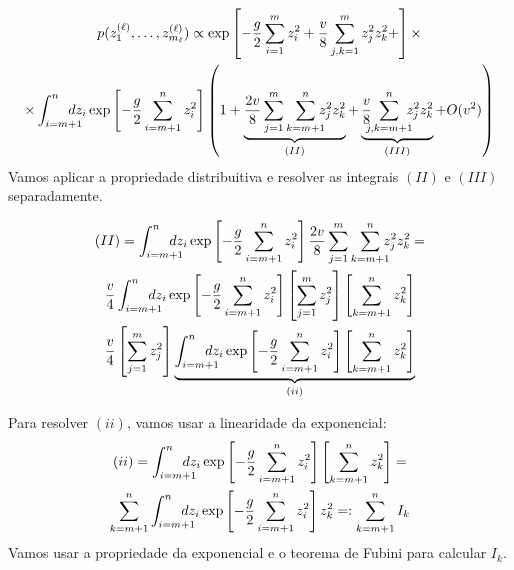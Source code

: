 \documentclass{beamer}
\def\eell{{(\ell)}}
\begin{document}
\begin{frame}

	{\footnotesize
	\begin{multline*}
		p(z_1^\eell, \ldots, z_{m_\ell}^\eell ) \propto \exp\left[-\frac{g}{2}\sum_{i=1}^{m}  z_i^2  + \frac{v}{8}\sum_{j,k=1}^{m}  z_j^2z_k^2 + \right]\times\\
		\times \int_{i=m+1}^{n}\hspace{-12pt} dz_i \exp\left[ -\frac{g}{2}\sum_{i=m+1}^{n}  z_i^2 \right] 
		\left(1+ \underbrace{\frac{2v}{8}\sum_{j=1}^{m}\sum_{k=m+1}^{n} \hspace*{-6pt}z_j^2z_k^2}_{(II)} +  \underbrace{\frac{v}{8}\hspace{-6pt}\sum_{j,k=m+1}^{n} \hspace{-6pt} z_j^2 z_k^2}_{(III)}  + O(v^2)\right)
	\end{multline*}}
	Vamos aplicar a propriedade distribuitiva e resolver as integrais $(II)$ e $(III)$ separadamente.
\end{frame}

\begin{frame}

	\small
	\begin{multline*}
		(II) = \int_{i=m+1}^{n}\hspace{-12pt} dz_i \exp\left[ -\frac{g}{2}\sum_{i=m+1}^{n}  z_i^2 \right] \frac{2v}{8}\sum_{j=1}^{m}\sum_{k=m+1}^{n} \hspace*{-6pt}z_j^2z_k^2 = \\ %
		 \frac{v}{4}\int_{i=m+1}^{n}\hspace{-12pt} dz_i \exp\left[ -\frac{g}{2}\sum_{i=m+1}^{n}  z_i^2 \right]\left[\sum_{j=1}^{m}z_j^2\right]\left[\sum_{k=m+1}^{n}z_k^2\right] \\ %
		 \frac{v}{4}\left[\sum_{j=1}^{m}z_j^2\right]\underbrace{\int_{i=m+1}^{n}\hspace{-12pt} dz_i \exp\left[ -\frac{g}{2}\sum_{i=m+1}^{n}  z_i^2 \right]\left[\sum_{k=m+1}^{n}z_k^2\right]}_{(ii)}
	\end{multline*}
\end{frame}


\begin{frame}
	Para resolver $(ii)$, vamos usar a linearidade da exponencial:	{\small
	\begin{multline*}
		(ii) = \int_{i=m+1}^{n}\hspace{-12pt} dz_i \exp\left[ -\frac{g}{2}\sum_{i=m+1}^{n}  z_i^2 \right]\left[\sum_{k=m+1}^{n}z_k^2\right]  = \\ %
		\sum_{k=m+1}^{n} \int_{i=m+1}^{n}\hspace{-12pt} dz_i \exp\left[ -\frac{g}{2}\sum_{i=m+1}^{n}  z_i^2 \right] z_k^2 =: 
		\sum_{k=m+1}^{n} I_k\\ %
	\end{multline*}}
	Vamos usar a propriedade da exponencial e o teorema de Fubini para calcular $I_k$.
\end{frame}
\end{document}
